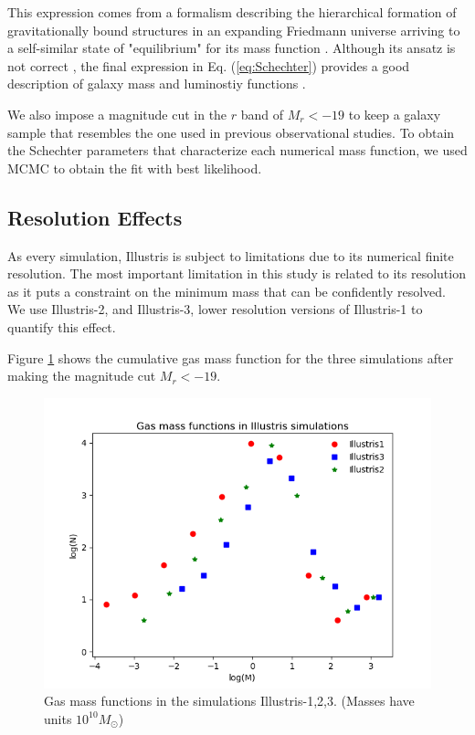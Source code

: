 \documentclass[a4paper,fleqn,usenatbib]{mnras}
\begin{document}
This expression comes from a formalism describing the hierarchical
formation of gravitationally bound structures in an expanding
Friedmann universe arriving to a self-similar state of "equilibrium"
for its mass function \cite{Schechter1976}. 
Although its ansatz is not correct \cite{inaccurateSchechter}, the
final expression in Eq. (\ref{eq:Schechter}) provides a good
description of galaxy mass and luminostiy functions
\cite{wellfitSchechter}. 

We also impose a magnitude cut in the $r$ band of $M_r<-19$ to keep
a galaxy sample that resembles the one used in previous observational
studies. 
To obtain the Schechter parameters that characterize each numerical
mass function, we used MCMC to obtain the fit with best likelihood. 


\subsection{Resolution Effects}

As every simulation, Illustris is subject to limitations due to its
numerical finite resolution.
The most important limitation in this study is related to its
resolution as it puts a constraint on the minimum mass that can be 
confidently resolved.
We use Illustris-2, and Illustris-3, lower resolution versions of
Illustris-1 to quantify this effect.


Figure \ref{fig:resolution_effects} shows the cumulative gas mass
function for the three simulations after making the magnitude cut
$M_r<-19$. 

\begin{figure}
	\includegraphics[width=\columnwidth]{./pics/MassResolution.png}
    \caption{Gas mass functions in the simulations Illustris-1,2,3. (Masses have units $10^{10}M_\odot$)}  
    \label{fig:resolution_effects}
\end{figure}
\end{document}
